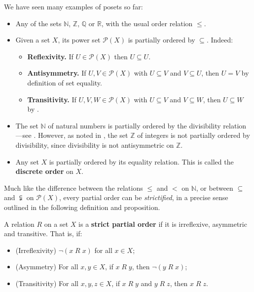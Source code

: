 \begin{example}
We have seen many examples of posets so far:
\begin{itemize}
\item Any of the sets $\mathbb{N}$, $\mathbb{Z}$, $\mathbb{Q}$ or $\mathbb{R}$, with the usual order relation $\le$.
\item Given a set $X$, its power set $\mathcal{P}(X)$ is partially ordered by $\subseteq$. Indeed:
\begin{itemize}
\item \textbf{Reflexivity.} If $U \in \mathcal{P}(X)$ then $U \subseteq U$.
\item \textbf{Antisymmetry.} If $U,V \in \mathcal{P}(X)$ with $U \subseteq V$ and $V \subseteq U$, then $U=V$ by definition of set equality.
\item \textbf{Transitivity.} If $U,V,W \in \mathcal{P}(X)$ with $U \subseteq V$ and $V \subseteq W$, then $U \subseteq W$ by .
\end{itemize}
\item The set $\mathbb{N}$ of natural numbers is partially ordered by the divisibility relation---see . However, as noted in , the set $\mathbb{Z}$ of integers is not partially ordered by divisibility, since divisibility is not antisymmetric on $\mathbb{Z}$.
\item Any set $X$ is partially ordered by its equality relation. This is called the \textbf{discrete order} on $X$.
\end{itemize}
\end{example}

Much like the difference between the relations $\le$ and $<$ on $\mathbb{N}$, or between $\subseteq$ and $\subsetneqq$ on $\mathcal{P}(X)$, every partial order can be \textit{strictified}, in a precise sense outlined in the following definition and proposition.

\begin{definition}
A relation $R$ on a set $X$ is a \textbf{strict partial order} if it is irreflexive, asymmetric and transitive. That is, if:
\begin{itemize} 
\item (Irreflexivity) $\neg (x\; R\; x)$ for all $x \in X$;
\item (Asymmetry) For all $x,y \in X$, if $x\; R\; y$, then $\neg(y\; R\; x)$;
\item (Transitivity) For all $x,y,z \in X$, if $x\; R\; y$ and $y\; R\; z$, then $x\; R\; z$.
\end{itemize}
\end{definition}

